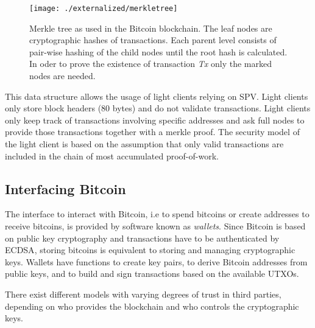 \begin{figure}[!t]
    \centering
    \texttt{[image: ./externalized/merkletree]}
    \caption{Merkle tree as used in the Bitcoin blockchain. The leaf nodes are cryptographic hashes of transactions. Each parent level consists of pair-wise hashing of the child nodes until the root hash is calculated. In oder to prove the existence of transaction \emph{Tx} only the marked nodes are needed.}
    \label{fig:merkletree}
  \end{figure} 

  This data structure allows the usage of light clients relying on \ac{SPV}. Light clients only store block headers (80 bytes) and do not validate transactions. Light clients only keep track of transactions involving specific addresses and ask full nodes to provide those transactions together with a merkle proof. The security model of the light client is based on the assumption that only valid transactions are included in the chain of most accumulated proof-of-work.


\subsection{Interfacing Bitcoin}

The interface to interact with Bitcoin, i.e to spend bitcoins or create addresses to receive bitcoins, is provided by software known as \emph{wallets}. Since Bitcoin is based on public key cryptography and transactions have to be authenticated by \ac{ECDSA}, storing bitcoins is equivalent to storing and managing cryptographic keys. Wallets have functions to create key pairs, to derive Bitcoin addresses from public keys, and to build and sign transactions based on the available \ac{UTXO}s. 

There exist different models with varying degrees of trust in third parties, depending on who provides the blockchain and who controls the cryptographic keys. 




